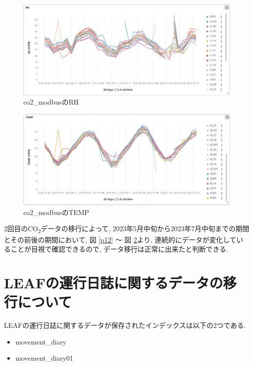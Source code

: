 \begin{figure}
    \begin{center}
        \includegraphics[width=160mm]{sotu/figure/rh.png}
        \caption{co2\_modbusのRH}
        \label{p13}
    \end{center}
\end{figure}

\begin{figure}
    \begin{center}
        \includegraphics[width=160mm]{sotu/figure/temp.png}
        \caption{co2\_modbusのTEMP}
        \label{p14}
    \end{center}
\end{figure}

2回目のCO\textsubscript{2}データの移行によって, 2023年5月中旬から2023年7月中旬までの期間とその前後の期間において, 図 \ref{p12} 〜 図 \ref{p14}より, 連続的にデータが変化していることが目視で確認できるので, データ移行は正常に出来たと判断できる.

\section{LEAFの運行日誌に関するデータの移行について}

LEAFの運行日誌に関するデータが保存されたインデックスは以下の2つである.

\begin{itemize}
    \item movement\_diary
    \item movement\_diary01
\end{itemize}

